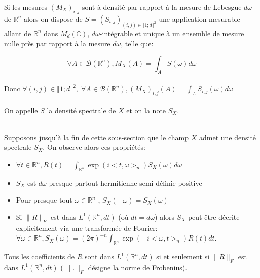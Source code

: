 \begin{definition}
Si les mesures $(M_{X})_{i,j}$ sont à densité par rapport à la mesure de Lebesgue $d\omega$ de $\mathbb{R}^n$ alors on dispose de $S = (S_{i,j})_{(i,j) \in \llbracket 1; d \rrbracket^2}  $ une application mesurable allant de $\mathbb{R}^n$ dans $M_d(\mathbb{C})$, $d\omega$-intégrable et unique à un ensemble de mesure nulle près par rapport à la mesure $d\omega$, telle que:

\begin{equation} \forall A \in \mathcal{B}(\mathbb{R}^n),  M_X(A) = \displaystyle\int_{A} S(\omega)d\omega \end{equation}
\\ Donc $\forall (i,j) \in \llbracket 1; d \rrbracket^2, \; \forall A \in \mathcal{B}(\mathbb{R}^n), (M_{X})_{i,j}(A) = \displaystyle\int_{A} S_{i,j}(\omega)d\omega$\\
~\\On appelle $S$ la densité spectrale de $X$ et on la note $S_X$.

\end{definition}
~\\
Supposons jusqu'à la fin de cette sous-section que le champ $X$ admet une
densité spectrale $S_X$. On observe alors ces propriétés:\\
\begin{itemize}
\item $\forall t \in \mathbb{R}^n, R(t) = \displaystyle\int_{\mathbb{R}^n} \exp(i<t,\omega>_{n})S_X(\omega) d\omega$

\item  $S_X$ est $d\omega$-presque partout hermitienne semi-définie positive

\item Pour presque tout $\omega \in \mathbb{R}^n$ , $S_X(-\omega) = \overline{S_X(\omega)}$

\item Si  $\|R\|_F$ est dans $L^1(\mathbb{R}^n,dt)$ (où $dt = d\omega$)  alors $S_X$ peut être décrite explicitement via une transformée de Fourier: \\$\forall \omega \in \mathbb{R}^n, S_X(\omega) = (2\pi)^{-n}\displaystyle\int_{\mathbb{R}^n} \exp(-i<\omega,t>_n)R(t) dt $. \\
\end{itemize}

\begin{remark}
Tous les coefficients de $R$ sont dans $L^1(\mathbb{R}^n,dt)$ si et seulement si
$\|R\|_F$ est dans $L^1(\mathbb{R}^n,dt)$ ($\;\|.\|_F$ désigne la norme de Frobenius).
\end{remark}



